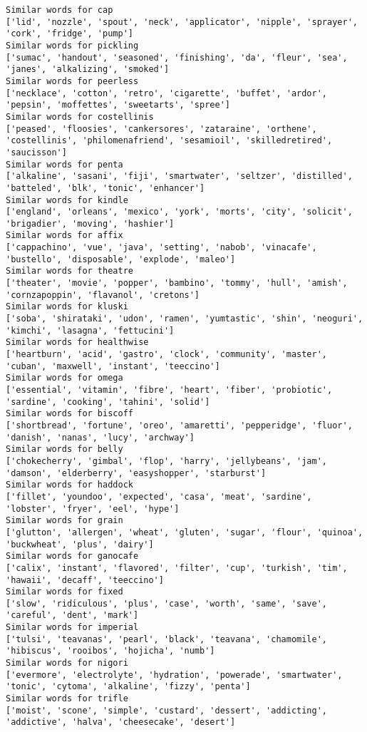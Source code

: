 \documentclass[11pt]{article}
\begin{document}
\begin{Verbatim}[commandchars=\\\{\}]
Similar words for cap
['lid', 'nozzle', 'spout', 'neck', 'applicator', 'nipple', 'sprayer', 'cork', 'fridge', 'pump']
Similar words for pickling
['sumac', 'handout', 'seasoned', 'finishing', 'da', 'fleur', 'sea', 'janes', 'alkalizing', 'smoked']
Similar words for peerless
['necklace', 'cotton', 'retro', 'cigarette', 'buffet', 'ardor', 'pepsin', 'moffettes', 'sweetarts', 'spree']
Similar words for costellinis
['peased', 'floosies', 'cankersores', 'zataraine', 'orthene', 'costellinis', 'philomenafriend', 'sesamioil', 'skilledretired', 'saucisson']
Similar words for penta
['alkaline', 'sasani', 'fiji', 'smartwater', 'seltzer', 'distilled', 'batteled', 'blk', 'tonic', 'enhancer']
Similar words for kindle
['england', 'orleans', 'mexico', 'york', 'morts', 'city', 'solicit', 'brigadier', 'moving', 'hashier']
Similar words for affix
['cappachino', 'vue', 'java', 'setting', 'nabob', 'vinacafe', 'bustello', 'disposable', 'explode', 'maleo']
Similar words for theatre
['theater', 'movie', 'popper', 'bambino', 'tommy', 'hull', 'amish', 'cornzapoppin', 'flavanol', 'cretons']
Similar words for kluski
['soba', 'shirataki', 'udon', 'ramen', 'yumtastic', 'shin', 'neoguri', 'kimchi', 'lasagna', 'fettucini']
Similar words for healthwise
['heartburn', 'acid', 'gastro', 'clock', 'community', 'master', 'cuban', 'maxwell', 'instant', 'teeccino']
Similar words for omega
['essential', 'vitamin', 'fibre', 'heart', 'fiber', 'probiotic', 'sardine', 'cooking', 'tahini', 'solid']
Similar words for biscoff
['shortbread', 'fortune', 'oreo', 'amaretti', 'pepperidge', 'fluor', 'danish', 'nanas', 'lucy', 'archway']
Similar words for belly
['chokecherry', 'gimbal', 'flop', 'harry', 'jellybeans', 'jam', 'damson', 'elderberry', 'easyshopper', 'starburst']
Similar words for haddock
['fillet', 'youndoo', 'expected', 'casa', 'meat', 'sardine', 'lobster', 'fryer', 'eel', 'hype']
Similar words for grain
['glutton', 'allergen', 'wheat', 'gluten', 'sugar', 'flour', 'quinoa', 'buckwheat', 'plus', 'dairy']
Similar words for ganocafe
['calix', 'instant', 'flavored', 'filter', 'cup', 'turkish', 'tim', 'hawaii', 'decaff', 'teeccino']
Similar words for fixed
['slow', 'ridiculous', 'plus', 'case', 'worth', 'same', 'save', 'careful', 'dent', 'mark']
Similar words for imperial
['tulsi', 'teavanas', 'pearl', 'black', 'teavana', 'chamomile', 'hibiscus', 'rooibos', 'hojicha', 'numb']
Similar words for nigori
['evermore', 'electrolyte', 'hydration', 'powerade', 'smartwater', 'tonic', 'cytoma', 'alkaline', 'fizzy', 'penta']
Similar words for trifle
['moist', 'scone', 'simple', 'custard', 'dessert', 'addicting', 'addictive', 'halva', 'cheesecake', 'desert']

\end{Verbatim}
\end{document}
